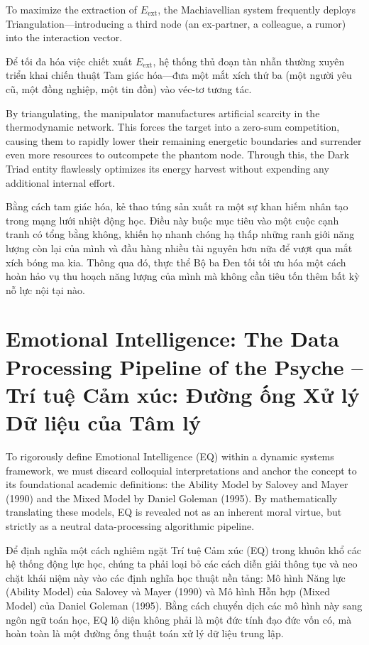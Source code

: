 \documentclass{report}
\begin{document}
To maximize the extraction of $E_{\text{ext}}$, the Machiavellian system frequently deploys Triangulation—introducing a third node (an ex-partner, a colleague, a rumor) into the interaction vector. 

Để tối đa hóa việc chiết xuất $E_{\text{ext}}$, hệ thống thủ đoạn tàn nhẫn thường xuyên triển khai chiến thuật Tam giác hóa—đưa một mắt xích thứ ba (một người yêu cũ, một đồng nghiệp, một tin đồn) vào véc-tơ tương tác.

By triangulating, the manipulator manufactures artificial scarcity in the thermodynamic network. This forces the target into a zero-sum competition, causing them to rapidly lower their remaining energetic boundaries and surrender even more resources to outcompete the phantom node. Through this, the Dark Triad entity flawlessly optimizes its energy harvest without expending any additional internal effort.

Bằng cách tam giác hóa, kẻ thao túng sản xuất ra một sự khan hiếm nhân tạo trong mạng lưới nhiệt động học. Điều này buộc mục tiêu vào một cuộc cạnh tranh có tổng bằng không, khiến họ nhanh chóng hạ thấp những ranh giới năng lượng còn lại của mình và đầu hàng nhiều tài nguyên hơn nữa để vượt qua mắt xích bóng ma kia. Thông qua đó, thực thể Bộ ba Đen tối tối ưu hóa một cách hoàn hảo vụ thu hoạch năng lượng của mình mà không cần tiêu tốn thêm bất kỳ nỗ lực nội tại nào.


\chapter{Emotional Intelligence: The Data Processing Pipeline of the Psyche -- Trí tuệ Cảm xúc: Đường ống Xử lý Dữ liệu của Tâm lý}

To rigorously define Emotional Intelligence (EQ) within a dynamic systems framework, we must discard colloquial interpretations and anchor the concept to its foundational academic definitions: the Ability Model by Salovey and Mayer (1990) and the Mixed Model by Daniel Goleman (1995). By mathematically translating these models, EQ is revealed not as an inherent moral virtue, but strictly as a neutral data-processing algorithmic pipeline.

Để định nghĩa một cách nghiêm ngặt Trí tuệ Cảm xúc (EQ) trong khuôn khổ các hệ thống động lực học, chúng ta phải loại bỏ các cách diễn giải thông tục và neo chặt khái niệm này vào các định nghĩa học thuật nền tảng: Mô hình Năng lực (Ability Model) của Salovey và Mayer (1990) và Mô hình Hỗn hợp (Mixed Model) của Daniel Goleman (1995). Bằng cách chuyển dịch các mô hình này sang ngôn ngữ toán học, EQ lộ diện không phải là một đức tính đạo đức vốn có, mà hoàn toàn là một đường ống thuật toán xử lý dữ liệu trung lập.
\end{document}
